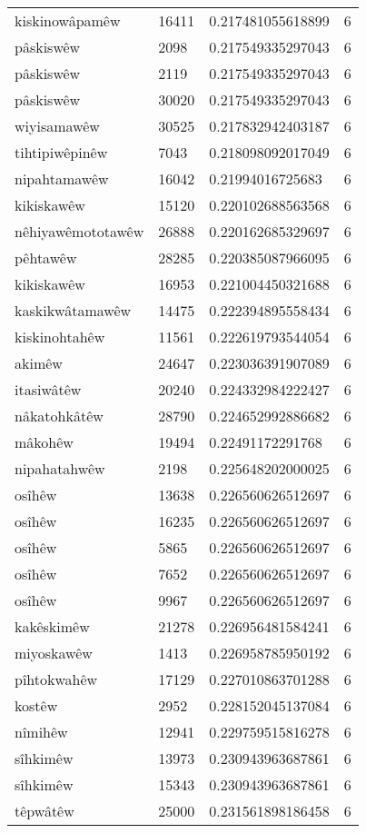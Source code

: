 \begin{longtable}{llll}
kiskinowâpamêw & 16411 & 0.217481055618899 & 6\\
pâskiswêw & 2098 & 0.217549335297043 & 6\\
pâskiswêw & 2119 & 0.217549335297043 & 6\\
pâskiswêw & 30020 & 0.217549335297043 & 6\\
wiyisamawêw & 30525 & 0.217832942403187 & 6\\
tihtipiwêpinêw & 7043 & 0.218098092017049 & 6\\
nipahtamawêw & 16042 & 0.21994016725683 & 6\\
kikiskawêw & 15120 & 0.220102688563568 & 6\\
nêhiyawêmototawêw & 26888 & 0.220162685329697 & 6\\
pêhtawêw & 28285 & 0.220385087966095 & 6\\
kikiskawêw & 16953 & 0.221004450321688 & 6\\
kaskikwâtamawêw & 14475 & 0.222394895558434 & 6\\
kiskinohtahêw & 11561 & 0.222619793544054 & 6\\
akimêw & 24647 & 0.223036391907089 & 6\\
itasiwâtêw & 20240 & 0.224332984222427 & 6\\
nâkatohkâtêw & 28790 & 0.224652992886682 & 6\\
mâkohêw & 19494 & 0.22491172291768 & 6\\
nipahatahwêw & 2198 & 0.225648202000025 & 6\\
osîhêw & 13638 & 0.226560626512697 & 6\\
osîhêw & 16235 & 0.226560626512697 & 6\\
osîhêw & 5865 & 0.226560626512697 & 6\\
osîhêw & 7652 & 0.226560626512697 & 6\\
osîhêw & 9967 & 0.226560626512697 & 6\\
kakêskimêw & 21278 & 0.226956481584241 & 6\\
miyoskawêw & 1413 & 0.226958785950192 & 6\\
pîhtokwahêw & 17129 & 0.227010863701288 & 6\\
kostêw & 2952 & 0.228152045137084 & 6\\
nîmihêw & 12941 & 0.229759515816278 & 6\\
sîhkimêw & 13973 & 0.230943963687861 & 6\\
sîhkimêw & 15343 & 0.230943963687861 & 6\\
têpwâtêw & 25000 & 0.231561898186458 & 6\\

\end{longtable}
